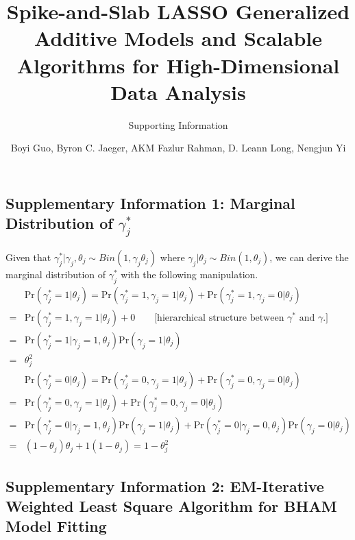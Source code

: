 \documentclass[
]{article}
\title{Spike-and-Slab LASSO Generalized Additive Models and Scalable
Algorithms for High-Dimensional Data Analysis}
\subtitle{Supporting Information}
\author{Boyi Guo, Byron C. Jaeger, AKM Fazlur Rahman, D. Leann Long,
Nengjun Yi}
\date{}
\begin{document}
\maketitle

\newcommand{\tp}{*}
\newcommand{\pr}{\text{Pr}}
\newcommand{\bs}[1]{\boldsymbol{#1}}
\newcommand{\simiid}{\overset{\text{iid}}{\sim}}

\subsection{Supplementary Information 1: Marginal Distribution of $\gamma_j^*$}

Given that
\(\gamma_{j}^*| \gamma_{j}, \theta_j \sim Bin(1, \gamma_{j}\theta_j)\)
where \(\gamma_{j} | \theta_j \sim Bin(1, \theta_j)\), we can derive the
marginal distribution of \(\gamma_{j}^*\) with the following
manipulation. \begin{align*}
& \text{Pr}(\gamma_j^*= 1 | \theta_j)  = \text{Pr}(\gamma_j^*= 1, \gamma_j = 1 | \theta_j) + \text{Pr}(\gamma_j^*= 1 , \gamma_j = 0| \theta_j)\\
= & \text{Pr}(\gamma_j^*= 1, \gamma_j = 1 | \theta_j) + 0 \qquad \text{[hierarchical structure between }\gamma^*\text{ and }\gamma \text{.]}\\
= & \text{Pr}(\gamma_j^*= 1| \gamma_j = 1,  \theta_j)\text{Pr}(\gamma_j = 1| \theta_j)\\
= & \theta_j^2\\
& \text{Pr}(\gamma_j^*= 0 | \theta_j)  = \text{Pr}(\gamma_j^*= 0, \gamma_j = 1 | \theta_j) + \text{Pr}(\gamma_j^*= 0 , \gamma_j = 0| \theta_j)\\
= & \text{Pr}(\gamma_j^*= 0, \gamma_j = 1 | \theta_j) + \text{Pr}(\gamma_j^*= 0, \gamma_j = 0 | \theta_j)\\
= & \text{Pr}(\gamma_j^*= 0| \gamma_j = 1,  \theta_j)\text{Pr}(\gamma_j = 1| \theta_j) + \text{Pr}(\gamma_j^*= 0| \gamma_j = 0,  \theta_j)\text{Pr}(\gamma_j = 0| \theta_j)\\
= & (1-\theta_j)\theta_j + 1(1-\theta_j) = 1-\theta_j^2
\end{align*}

\clearpage

\subsection{Supplementary Information 2: EM-Iterative Weighted Least Square Algorithm for BHAM Model Fitting}
\end{document}

